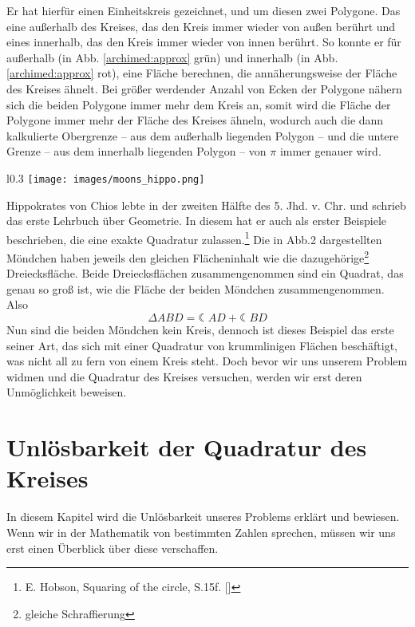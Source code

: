 \documentclass[11pt]{article}
\begin{document}
Er hat hierfür einen Einheitskreis gezeichnet, und um diesen zwei Polygone. Das eine außerhalb des Kreises, das den Kreis immer wieder von außen berührt und eines innerhalb, das den Kreis immer wieder von innen berührt. So konnte er für außerhalb (in Abb. \ref{archimed:approx} grün) und innerhalb (in Abb. \ref{archimed:approx} rot), eine Fläche berechnen, die annäherungsweise der Fläche des Kreises ähnelt. Bei größer werdender Anzahl von Ecken der Polygone nähern sich die beiden Polygone immer mehr dem Kreis an, somit wird die Fläche der Polygone immer mehr der Fläche des Kreises ähneln, wodurch auch die dann kalkulierte Obergrenze – aus dem außerhalb liegenden Polygon – und die untere Grenze – aus dem innerhalb liegenden Polygon – von \(\pi\) immer genauer wird. \par
\begin{wrapfigure}{l}{0.3 \textwidth}
    \centering
    \texttt{[image: images/moons\_hippo.png]}
    \caption{Möndchen des Hippokrates}\label{archimed:approx}
\end{wrapfigure}
\newpage Hippokrates von Chios lebte in der zweiten Hälfte des 5. Jhd. v. Chr. und schrieb das erste Lehrbuch über Geometrie. In diesem hat er auch als erster Beispiele beschrieben, die eine exakte Quadratur zulassen.\footnote{E. Hobson, Squaring of the circle, S.15f. [\HobsonInt]} Die in Abb.2 dargestellten \glqq Möndchen\grqq{} haben jeweils den gleichen Flächeninhalt wie die dazugehörige\footnote{gleiche Schraffierung} Dreiecksfläche. Beide Dreiecksflächen zusammengenommen sind ein Quadrat, das genau so groß ist, wie die Fläche der beiden \glqq Möndchen\grqq{} zusammengenommen. Also \[\Delta ABD = \leftmoon AD + \leftmoon BD\] Nun sind die beiden \glqq Möndchen\grqq{} kein Kreis, dennoch ist dieses Beispiel das erste seiner Art, das sich mit einer Quadratur von krummlinigen Flächen beschäftigt, was nicht all zu fern von einem Kreis steht. Doch bevor wir uns unserem Problem widmen und die Quadratur des Kreises versuchen, werden wir erst deren Unmöglichkeit beweisen.
\clearpage\newpage
\section{Unlösbarkeit der Quadratur des Kreises}
In diesem Kapitel wird die Unlösbarkeit unseres Problems erklärt und bewiesen. Wenn wir in der Mathematik von bestimmten Zahlen sprechen, müssen wir uns erst einen Überblick über diese verschaffen.
\end{document}

